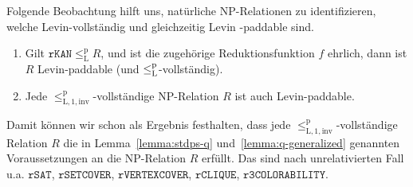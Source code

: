 Folgende Beobachtung hilft uns, natürliche NP-Relationen zu identifizieren, welche Levin-vollständig und gleichzeitig Levin -paddable sind.
\begin{observation}\label{obs:invcomplete-sind-levinpaddable}
    \begin{enumerate}
        \item Gilt $\mathtt{rKAN}\leq_\mathrm{L}^\mathrm{p} R$, und ist die zugehörige Reduktionsfunktion $f$ ehrlich, dann ist $R$ Levin-paddable (und $\leq_\mathrm{L}^\mathrm{p}$-vollständig).
        \item Jede $\leq_\mathrm{L,1,inv}^\mathrm{p}$-vollständige NP-Relation $R$ ist auch Levin-paddable.
    \end{enumerate}
\end{observation}
Damit können wir schon als Ergebnis festhalten, dass 
jede $\leq_\mathrm{L,1,inv}^\mathrm{p}$-vollständige Relation $R$ die in 
Lemma~\ref{lemma:stdps-q} und~\ref{lemma:q-generalized} genannten Voraussetzungen an die NP-Relation $R$ erfüllt.
Das sind nach \textcite{goldreich_computational_2008} unrelativierten Fall u.a. $\mathtt{rSAT}$, $\mathtt{rSETCOVER}$, $\mathtt{rVERTEXCOVER}$, $\mathtt{rCLIQUE}$, $\mathtt{r3COLORABILITY}$.

